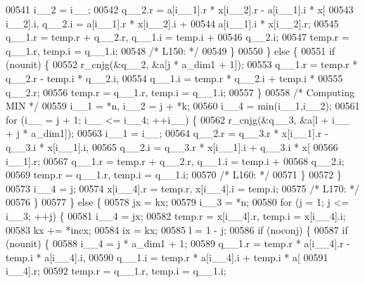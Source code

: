 \begin{DoxyCode}
00541                 i\_\_2 = i\_\_;
00542                 q\_\_2.r = a[i\_\_1].r * x[i\_\_2].r - a[i\_\_1].i * x[
00543                     i\_\_2].i, q\_\_2.i = a[i\_\_1].r * x[i\_\_2].i + 
00544                     a[i\_\_1].i * x[i\_\_2].r;
00545                 q\_\_1.r = temp.r + q\_\_2.r, q\_\_1.i = temp.i + 
00546                     q\_\_2.i;
00547                 temp.r = q\_\_1.r, temp.i = q\_\_1.i;
00548 \textcolor{comment}{/* L150: */}
00549             \}
00550             \} \textcolor{keywordflow}{else} \{
00551             \textcolor{keywordflow}{if} (nounit) \{
00552                 r\_cnjg(&q\_\_2, &a[j * a\_dim1 + 1]);
00553                 q\_\_1.r = temp.r * q\_\_2.r - temp.i * q\_\_2.i, 
00554                     q\_\_1.i = temp.r * q\_\_2.i + temp.i * 
00555                     q\_\_2.r;
00556                 temp.r = q\_\_1.r, temp.i = q\_\_1.i;
00557             \}
00558 \textcolor{comment}{/* Computing MIN */}
00559             i\_\_1 = *n, i\_\_2 = j + *k;
00560             i\_\_4 = min(i\_\_1,i\_\_2);
00561             \textcolor{keywordflow}{for} (i\_\_ = j + 1; i\_\_ <= i\_\_4; ++i\_\_) \{
00562                 r\_cnjg(&q\_\_3, &a[l + i\_\_ + j * a\_dim1]);
00563                 i\_\_1 = i\_\_;
00564                 q\_\_2.r = q\_\_3.r * x[i\_\_1].r - q\_\_3.i * x[i\_\_1].i, 
00565                     q\_\_2.i = q\_\_3.r * x[i\_\_1].i + q\_\_3.i * x[
00566                     i\_\_1].r;
00567                 q\_\_1.r = temp.r + q\_\_2.r, q\_\_1.i = temp.i + 
00568                     q\_\_2.i;
00569                 temp.r = q\_\_1.r, temp.i = q\_\_1.i;
00570 \textcolor{comment}{/* L160: */}
00571             \}
00572             \}
00573             i\_\_4 = j;
00574             x[i\_\_4].r = temp.r, x[i\_\_4].i = temp.i;
00575 \textcolor{comment}{/* L170: */}
00576         \}
00577         \} \textcolor{keywordflow}{else} \{
00578         jx = kx;
00579         i\_\_3 = *n;
00580         \textcolor{keywordflow}{for} (j = 1; j <= i\_\_3; ++j) \{
00581             i\_\_4 = jx;
00582             temp.r = x[i\_\_4].r, temp.i = x[i\_\_4].i;
00583             kx += *incx;
00584             ix = kx;
00585             l = 1 - j;
00586             \textcolor{keywordflow}{if} (noconj) \{
00587             \textcolor{keywordflow}{if} (nounit) \{
00588                 i\_\_4 = j * a\_dim1 + 1;
00589                 q\_\_1.r = temp.r * a[i\_\_4].r - temp.i * a[i\_\_4].i, 
00590                     q\_\_1.i = temp.r * a[i\_\_4].i + temp.i * a[
00591                     i\_\_4].r;
00592                 temp.r = q\_\_1.r, temp.i = q\_\_1.i;

\end{DoxyCode}
